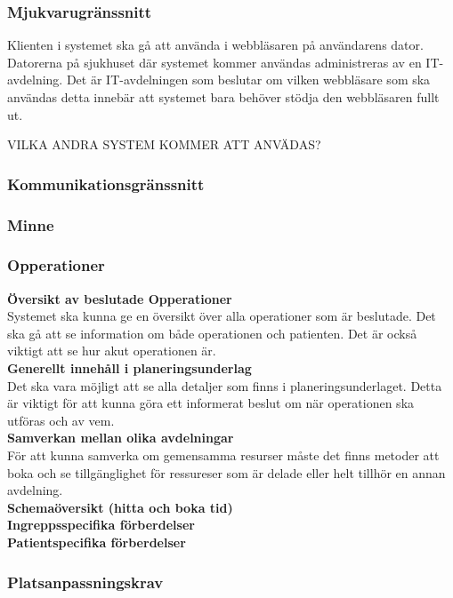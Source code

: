 \documentclass{article}
\begin{document}
\begin{enumerate}
\subsubsection{Mjukvarugränssnitt}
\label{subsec:Mjukvarugranssnitt}
Klienten i systemet ska gå att använda i webbläsaren på användarens dator.
Datorerna på sjukhuset där systemet kommer användas administreras av en
IT-avdelning. Det är IT-avdelningen som beslutar om vilken webbläsare som ska
användas detta innebär att systemet bara behöver stödja den webbläsaren fullt
ut.

VILKA ANDRA SYSTEM KOMMER ATT ANVÄDAS?
\subsubsection{Kommunikationsgränssnitt}
\label{subsec:Kommunikationsgranssnitt}
\subsubsection{Minne}
\label{subsec:Minne}
\subsubsection{Opperationer}
\label{subsec:Opperationer}
\textbf{Översikt av beslutade Opperationer}\\
Systemet ska kunna ge en översikt över alla operationer som är beslutade.
Det ska gå att se information om både operationen och patienten. Det är också
viktigt att se hur akut operationen är.\\
\textbf{Generellt innehåll i planeringsunderlag}\\
Det ska vara möjligt att se alla detaljer som finns i planeringsunderlaget.
Detta är viktigt för att kunna göra ett informerat beslut om när operationen ska
utföras och av vem.\\
\textbf{Samverkan mellan olika avdelningar}\\
För att kunna samverka om gemensamma resurser måste det finns metoder att boka
och se tillgänglighet för ressureser som är delade eller helt tillhör en annan
avdelning.\\
\textbf{Schemaöversikt (hitta och boka tid)}\\
\textbf{Ingreppsspecifika förberdelser}\\
\textbf{Patientspecifika förberdelser}\\

\subsubsection{Platsanpassningskrav}
\label{subsec:Platsanpassningskrav}

\end{enumerate}
\end{document}
